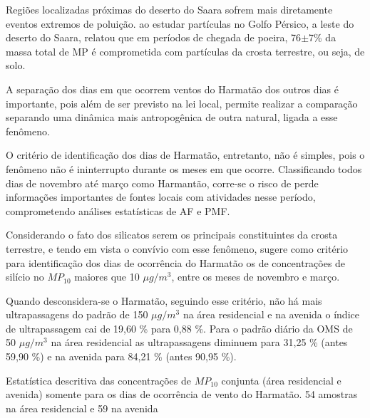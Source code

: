 Regiões localizadas próximas do deserto do Saara sofrem mais diretamente 
eventos extremos de poluição. \citet{kaku2016} ao estudar partículas no 
Golfo Pérsico, a leste do deserto do Saara, relatou que em períodos de chegada 
de poeira, 76$\pm$7\% da massa total de MP é comprometida com partículas da 
crosta terrestre, ou seja, de solo.

A separação dos dias em que ocorrem ventos do Harmatão dos outros dias é 
importante, pois além de ser previsto na lei local, permite realizar a 
comparação separando uma dinâmica mais antropogênica de outra natural, 
ligada a esse fenômeno.
  
O critério de identificação dos dias de Harmatão, entretanto, não é simples, 
pois o fenômeno não é ininterrupto durante os meses em que ocorre. 
Classificando todos dias de novembro até março como Harmantão, corre-se o risco
de perde informações importantes de fontes locais com atividades nesse período, 
comprometendo análises estatísticas de AF e PMF. 

Considerando o fato dos silicatos serem os principais constituintes da crosta
terrestre, e tendo em vista o convívio com esse fenômeno, \citet{aboh2009} 
sugere como critério para identificação dos dias de ocorrência do Harmatão 
os de concentrações de silício no $MP_{10}$ maiores que 10 $\mu g/m^3$, 
entre os meses de novembro e março. 

Quando desconsidera-se o Harmatão, seguindo esse critério,
não há mais ultrapassagens do padrão de 150 $\mu g / m^3$ na área residencial 
e na avenida o índice de ultrapassagem cai de 19,60 \% para 0,88 \%. 
Para o padrão diário da OMS de 50 $\mu g / m^3$ na área residencial as 
ultrapassagens diminuem para 31,25 \% (antes 59,90 \%) e na avenida para 
84,21 \% (antes 90,95 \%).

\begin{table}[H]
  \centering
  
  \caption{Estatística descritiva das concentrações de $MP_{10}$ conjunta
           (área residencial e avenida) somente para os dias de ocorrência 
           de vento do Harmatão. 54 amostras na área residencial e 59 na avenida 
          \label{table:descriptive_inalavel_harmatao}}
\end{table}

